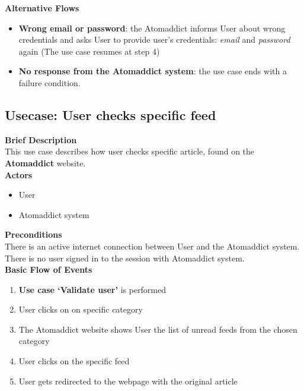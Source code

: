 \documentclass[12pt]{article}
\begin{document}
\vspace{0.5cm}


\textbf{Alternative Flows}

\begin{itemize}

    \item \textbf{Wrong email or password}: the Atomaddict informs User about wrong credentials and asks User to provide user's credentials: \emph{email} and \emph{password} again (The use case resumes at step 4)

    \item \textbf{No response from the Atomaddict system}: the use case ends with a failure condition.

\end{itemize}

\vspace{0.5cm}


\subsection{Usecase: User checks specific feed}
\textbf{Brief Description}\\
This use case describes how user checks specific article, found on the \textbf{Atomaddict} website.\\


\textbf{Actors}

\begin{itemize}

    \item User

    \item Atomaddict system

\end{itemize}

\vspace{0.5cm}


\textbf{Preconditions}\\
There is an active internet connection between User and the Atomaddict system. There is no user signed in to the session with Atomaddict system.\\


\textbf{Basic Flow of Events}

\begin{enumerate}

    \item \textbf{Use case `Validate user'} is performed

    \item User clicks on on specific category

    \item The Atomaddict website shows User the list of unread feeds from the chosen category

    \item User clicks on the specific feed

    \item User gets redirected to the webpage with the original article

\end{enumerate}
\end{document}
